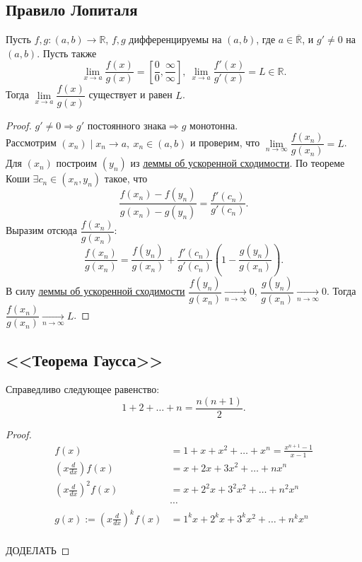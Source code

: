 \subsection{Правило Лопиталя}

\hypertarget{lope}{}
\begin{theorem}
	Пусть $f, g \colon (a, b) \to \mathbb{R}$, $f, g$ дифференцируемы на $(a, b)$, где $a \in \overline{\mathbb{R}}$, и $g' \neq 0$ на $(a, b)$.
	Пусть также \[
		\lim_{x \to a} \frac{f(x)}{g(x)} = \left[ \frac00, \frac{\infty}{\infty} \right],
		~\lim_{x \to a} \frac{f'(x)}{g'(x)} = L \in \mathbb{R}.
	\]
	Тогда $\lim\limits_{x \to a} \dfrac{f(x)}{g(x)}$ существует и равен $L$.
\end{theorem}

\begin{proof}
	$g' \neq 0 \Rightarrow g' \text{ постоянного знака} \Rightarrow g \text{ монотонна}$. \\
	Рассмотрим $(x_n) \mid x_n \to a, ~x_n \in (a, b)$ и проверим, что $\lim\limits_{n \to \infty} \dfrac{f(x_n)}{g(x_n)} = L$.
	Для $(x_n)$ построим $(y_n)$ из \hyperlink{shodimost'}{леммы об ускоренной сходимости}. По теореме Коши
	$\exists c_n \in (x_n, y_n)$ такое, что \[
		\frac{f(x_n) - f(y_n)}{g(x_n) - g(y_n)} = \frac{f'(c_n)}{g'(c_n)}.
	\]
	Выразим отсюда $\dfrac{f(x_n)}{g(x_n)}$: \[
		\frac{f(x_n)}{g(x_n)} = \frac{f(y_n)}{g(x_n)} + \frac{f'(c_n)}{g'(c_n)} \left( 1 - \frac{g(y_n)}{g(x_n)} \right).
	\]
	В силу \hyperlink{shodimost'}{леммы об ускоренной сходимости}
	\hbox{$\dfrac{f(y_n)}{g(x_n)} \xrightarrow[n \to \infty]{} 0$}, \hbox{$\dfrac{g(y_n)}{g(x_n)} \xrightarrow[n \to \infty]{} 0$}.
	Тогда $\dfrac{f(x_n)}{g(x_n)} \xrightarrow[n \to \infty]{} L$.
\end{proof}

\subsection{<<Теорема Гаусса>>}

\begin{theorem}
	Справедливо следующее равенство: \[
		1 + 2 + \ldots + n = \frac{n (n + 1)}{2}.
	\]
\end{theorem}

\begin{proof}
	\begin{align*}
									    		f(x) &= 1 + x + x^2 + \ldots + x^n = \frac{x^{n + 1} - 1}{x - 1}		\\
		 		  \left( x \frac{d}{dx} \right) f(x) &= x + 2 x + 3 x^2 + \ldots + n x^n								\\
				\left( x \frac{d}{dx} \right)^2 f(x) &= x + 2^2 x + 3^2 x^2 + \ldots + n^2 x^n							\\
													 &\cdots															\\
		g(x) := \left( x \frac{d}{dx} \right)^k f(x) &= 1^k x + 2^k x + 3^k x^2 + \ldots + n^k x^n						\\
	\end{align*}
	
	ДОДЕЛАТЬ
\end{proof}

